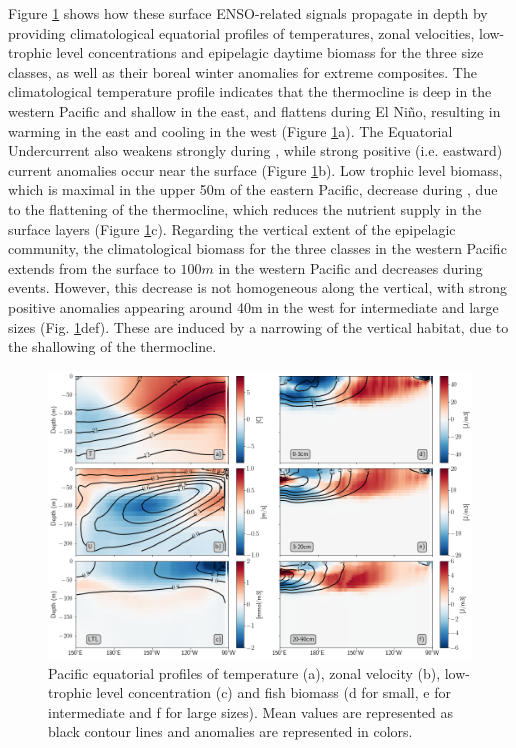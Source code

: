 Figure \ref{fig:profiles} shows how these surface ENSO-related signals propagate in depth by providing climatological equatorial profiles of temperatures, zonal velocities, low-trophic level concentrations and epipelagic daytime biomass for the three size classes, as well as their boreal winter anomalies for extreme \nino{} composites. The climatological temperature profile indicates that the thermocline is deep in the western Pacific and shallow in the east, and flattens during El Niño, resulting in warming in the east and cooling in the west (Figure  \ref{fig:profiles}a). The Equatorial Undercurrent also weakens strongly during \nino{}, while strong positive (i.e. eastward) current anomalies occur near the surface (Figure  \ref{fig:profiles}b). Low trophic level biomass, which is maximal in the upper 50m of the eastern Pacific, decrease during \nino{}, due to the flattening of the thermocline, which reduces the nutrient supply in the surface layers (Figure \ref{fig:profiles}c). Regarding the vertical extent of the epipelagic community, the climatological biomass for the three classes in the western Pacific extends from the surface to $100m$ in the western Pacific and decreases during \nino{} events. However, this decrease is not homogeneous along the vertical, with strong positive anomalies appearing around 40m in the west for intermediate and large sizes (Fig. \ref{fig:profiles}def). These are induced by a narrowing of the vertical habitat, due to the shallowing of the thermocline. 

\begin{figure}[h!tp]
	\centering
	\includegraphics[scale=0.4]{figs/forage_mean_ond97.png}	
	\caption{Pacific equatorial profiles of temperature (a), zonal velocity (b), low-trophic level concentration (c) and fish biomass (d for small, e for intermediate and f for large sizes). Mean values are represented as black contour lines and \nino{} anomalies are represented in colors.}	
	\label{fig:profiles}
\end{figure}

